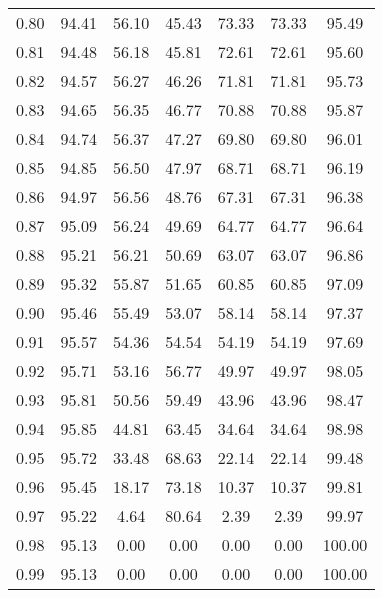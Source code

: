 \begin{tabular}{|c|c|c|c|c|c|c|}
      0.80 &     94.41 &     56.10 &      45.43 &   73.33 &      73.33 &         95.49 \\
      0.81 &     94.48 &     56.18 &      45.81 &   72.61 &      72.61 &         95.60 \\
      0.82 &     94.57 &     56.27 &      46.26 &   71.81 &      71.81 &         95.73 \\
      0.83 &     94.65 &     56.35 &      46.77 &   70.88 &      70.88 &         95.87 \\
      0.84 &     94.74 &     56.37 &      47.27 &   69.80 &      69.80 &         96.01 \\
      0.85 &     94.85 &     56.50 &      47.97 &   68.71 &      68.71 &         96.19 \\
      0.86 &     94.97 &     56.56 &      48.76 &   67.31 &      67.31 &         96.38 \\
      0.87 &     95.09 &     56.24 &      49.69 &   64.77 &      64.77 &         96.64 \\
      0.88 &     95.21 &     56.21 &      50.69 &   63.07 &      63.07 &         96.86 \\
      0.89 &     95.32 &     55.87 &      51.65 &   60.85 &      60.85 &         97.09 \\
      0.90 &     95.46 &     55.49 &      53.07 &   58.14 &      58.14 &         97.37 \\
      0.91 &     95.57 &     54.36 &      54.54 &   54.19 &      54.19 &         97.69 \\
      0.92 &     95.71 &     53.16 &      56.77 &   49.97 &      49.97 &         98.05 \\
      0.93 &     95.81 &     50.56 &      59.49 &   43.96 &      43.96 &         98.47 \\
      0.94 &     95.85 &     44.81 &      63.45 &   34.64 &      34.64 &         98.98 \\
      0.95 &     95.72 &     33.48 &      68.63 &   22.14 &      22.14 &         99.48 \\
      0.96 &     95.45 &     18.17 &      73.18 &   10.37 &      10.37 &         99.81 \\
      0.97 &     95.22 &      4.64 &      80.64 &    2.39 &       2.39 &         99.97 \\
      0.98 &     95.13 &      0.00 &       0.00 &    0.00 &       0.00 &        100.00 \\
      0.99 &     95.13 &      0.00 &       0.00 &    0.00 &       0.00 &        100.00 \\
\bottomrule
\end{tabular}
